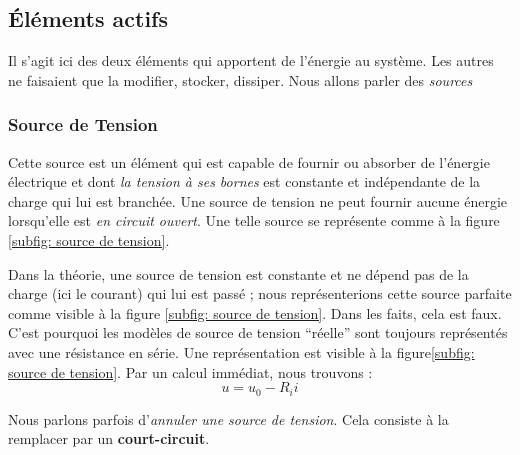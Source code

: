 \documentclass[12pt,a4paper]{article}
\begin{document}
\subsection{Éléments actifs}
\label{subsection: elements actifs}
Il s'agit ici des deux éléments qui apportent de l'énergie au système. Les autres ne faisaient que la modifier, stocker, dissiper. Nous allons parler des \textit{sources}

\subsubsection{Source de Tension}
\label{subsubsection: def source tension}
Cette source est un élément qui est capable de fournir ou absorber de l'énergie électrique et dont \textit{la tension à ses bornes} est constante et indépendante de la charge qui lui est branchée. Une source de tension ne peut fournir aucune énergie lorsqu'elle est \textit{en circuit ouvert}. Une telle source se représente comme à la figure \ref{subfig: source de tension}.

 Dans la théorie, une source de tension est constante et ne dépend pas de la charge (ici le courant) qui lui est passé ; nous représenterions cette source parfaite comme visible à la figure \ref{subfig: source de tension}. Dans les faits, cela est faux. C'est pourquoi les modèles de source de tension ``réelle'' sont toujours représentés avec une résistance en série. Une représentation est visible à la figure\ref{subfig: source de tension}. Par un calcul immédiat, nous trouvons :
\begin{equation}
	u = u_0 -R_ii
	\label{equ: resistance interne tension}
\end{equation}

 Nous parlons parfois d'\textit{annuler une source de tension}. Cela consiste à la remplacer par un \textbf{court-circuit}.
\end{document}
